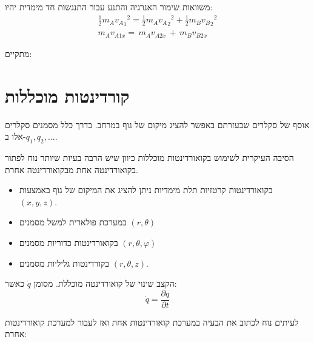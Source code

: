 \documentclass{tstextbook}
\begin{document}
\begin{proposition}
משוואות שימור האנרגיה והתנע עבור התנגשות חד מימדית יהיו:
\begin{gather*}{\frac{1}{2}}m_{A}{v_{A}}_{1}{}^{2}={\frac{1}{2}}m_{A}{v_{A}}_{2}{}^{2}+{\frac{1}{2}}m_{B}{v_{B}}_{2}{}^{2} \\m_{A}v_{A1x}=\,m_{A}v_{A2x}\,+\,m_{B}v_{B2x}
\end{gather*}

\end{proposition}
\begin{corollary}
מתקיים:

\end{corollary}

\section{קורדינטות מוכללות}

\begin{definition}
אוסף של סקלרים שבעזרתם באפשר להציג מיקום של גוף במרחב.
בדרך כלל מסמנים סקלרים אלו ב-\(q_{1},q_{2},\dots\).

\end{definition}
\begin{remark}
הסיבה העיקרית לשימוש בקואורדינטות מוכללות כיוון שיש הרבה בעיות שיותר נוח לפתור בקואורדינטה אחת מבקואורדינטה אחרת.

\end{remark}
\begin{example}
  \begin{itemize}
    \item בקואורדינטות קרטזיות תלת מימדיות ניתן להציג את המיקום של גוף באמצעות \((x,y,z)\).
    \item במערכת פולארית למשל מסמנים \(\left( r,\theta \right)\)
    \item בקואורדינטות כדוריות מסמנים \(\left( r,\theta,\varphi \right)\)
    \item בקורדינטות גליליות מסמנים \(\left( r,\theta,z \right)\).
  \end{itemize}
\end{example}
\begin{definition}
הקצב שינוי של קואורדינטה מוכללת. מסומן \(\dot{q}\) כאשר:
$$\dot{q}=\frac{\partial q}{\partial t}$$

\end{definition}
לעיתים נוח לכתוב את הבעיה במערכת קואורדינטות אחת ואז לעבור למערכת קואורדינטות אחרת:
\end{document}
